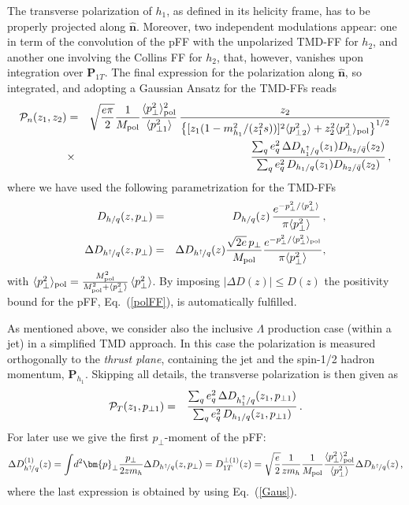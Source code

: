 \documentclass[submission, Proceedings]{SciPost}
\newcommand{\bea}{\begin{eqnarray}}
\newcommand{\eea}{\end{eqnarray}}
\newcommand{\be}{\begin{equation}}
\newcommand{\ee}{\end{equation}}
\begin{document}
The transverse polarization of $h_1$, as defined in its helicity frame, has to be properly projected along $\hat{\bm{n}}$.
Moreover, two independent modulations appear: one in term of the convolution of the pFF with the unpolarized TMD-FF for $h_2$, and another one involving the Collins FF for $h_2$, that, however, vanishes upon integration over $\bm{P}_{1T}$.
The final expression for the polarization along $\hat{\bm{n}}$, so integrated, and adopting a Gaussian Ansatz for the TMD-FFs reads
\bea
{\cal P}_n(z_1,z_2) & = & \sqrt{\frac{e\pi}{2}}\frac{1}{M_{\rm pol}} \frac{\langle p_\perp^2\rangle_{\rm pol}^2}{\langle p_{\perp 1}^2\rangle}\,\frac{z_2}{\big\{[z_1(1-m_{h_1}^2/(z_1^2s))]^2\langle p_{\perp 2}^2\rangle +z_2^2 \langle p_\perp^2\rangle_{\rm pol}\big\}^{1/2}}\nonumber\\
&\times & \frac{\sum_{q} e^2_q\,\Delta D_{h_1^\uparrow/q}(z_1)D_{h_2/\bar q}(z_2)}{ \sum_{q}  e^2_q\,
 D_{h_1/q}(z_1)D_{h_2/\bar q}(z_2)}\,,
\label{PolTh}
\eea
where we have used the following parametrization for the TMD-FFs
\bea
D_{h/q}(z,p_{\perp}) & = & D_{h/q}(z)\, \frac{e^{-p_{\perp}^2/\langle p_{\perp}^2\rangle}}{\pi \langle p_{\perp}^2\rangle} \,, \\
\Delta D_{h^\uparrow\!/q}(z,p_{\perp}) &= & \Delta D_{h^\uparrow\!/q}(z)  \frac{\sqrt{2e} \,p_{\perp}}{M_{\rm pol}} \frac{e^{-p_{\perp}^2/\langle p_{\perp}^2\rangle_{\rm pol}}}{\pi \langle p_{\perp}^2\rangle},%
\label{Gaus}
\eea
with $\langle p_\perp^2\rangle_{\rm pol} = \frac{M_{\rm pol}^2}{M_{\rm pol}^2 + \langle p_{\perp}^2\rangle} \,\langle p_{\perp}^2\rangle$.
By imposing $|\Delta D(z)|\le D(z)$ the positivity bound for the pFF, Eq.~(\ref{polFF}), is automatically fulfilled.

As mentioned above, we consider also the inclusive $\Lambda$ production case (within a jet) in a simplified TMD approach. In this case the polarization is measured orthogonally to the \emph{thrust plane}, containing the jet and the spin-1/2 hadron momentum, $\bm{P}_{h_1}$.
Skipping all details, the transverse polarization is then given as
%
\bea
{\cal P}_T(z_1, p_{\perp 1}) &  = & \frac{\sum_{q} e^2_q\,
\Delta D_{h_1^\uparrow/q}(z_1,p_{\perp 1})}{ \sum_{q}  e^2_q\,
D_{h_1/q}(z_1,p_{\perp 1})}\,.
\label{PolTjet}
\eea
%
For later use we give the first $p_\perp$-moment of the pFF:
\be
\Delta D_{h^\uparrow\!/q}^{(1)}(z)  =  \int\! d^2 \bm{p}_{\perp} \frac{p_{\perp}}{2 z m_h} \Delta D_{h^\uparrow\!/q}(z,p_{\perp}) =
D_{1T}^{\perp (1)}(z)
= \sqrt{\frac{e}{2}}\frac{1}{z m_h} \frac{1}{M_{\rm pol}}\frac{\langle p^2_{\perp} \rangle^{2}_{\rm pol}}{\langle p^2_{\perp} \rangle}  \Delta D_{h^\uparrow\!/q }(z)\,,
\label{1mom}
\ee
where the last expression is obtained by using Eq.~(\ref{Gaus}).
\end{document}
